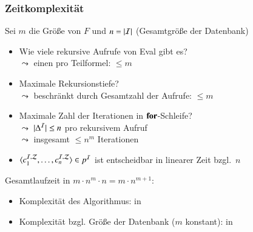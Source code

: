 \documentclass[aspectratio=1610,onlymath]{beamer}
\begin{document}
\begin{frame}\frametitle{Zeitkomplexität}

Sei $m$ die Größe von $F$ und $n=|\mathcal{I}|$ (Gesamtgröße der Datenbank)
\bigskip

\begin{itemize}
\item Wie viele rekursive Aufrufe von Eval gibt es?\\\pause
$\leadsto$ einen pro Teilformel: $\leq m$
%
\item Maximale Rekursionstiefe?\\\pause
$\leadsto$ beschränkt durch Gesamtzahl der Aufrufe: $\leq m$
%
\item Maximale Zahl der Iterationen in $\textbf{for}$-Schleife?\\\pause
$\leadsto$ $|\Delta^{\mathcal{I}}|\leq n$ pro rekursivem Aufruf\\
$\leadsto$ insgesamt $\leq n^m$ Iterationen
%
\item $\langle{c_1^{\mathcal{I},\mathcal{Z}},\ldots,c_n^{\mathcal{I},\mathcal{Z}}}\rangle\in p^{\mathcal{I}}$ ist entscheidbar in linearer Zeit bzgl.\ $n$
\end{itemize}
\bigskip\pause

Gesamtlaufzeit in $m\cdot n^m\cdot n=m\cdot n^{m+1}$:
\begin{itemize}
\item Komplexität des Algorithmus: \alert{in \ExpTime}
\item Komplexität bzgl. Größe der Datenbank ($m$ konstant): \alert{in \PTime}
\end{itemize}

\end{frame}
\end{document}
